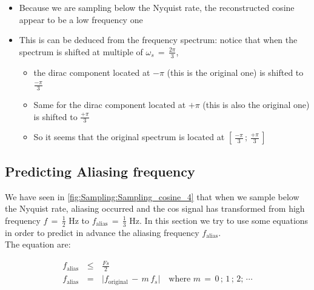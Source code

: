 \documentclass[12pt,a4paper]{book}
\begin{document}
\begin{itemize}

\item Because we are sampling below the Nyquist rate, the reconstructed cosine appear to be a low frequency one

\item This is can be deduced from the frequency spectrum: notice that when the spectrum is shifted at multiple of $\omega_s \, = \, \displaystyle\frac{2 \pi}{3}$, 

	\begin{itemize}
	
	\item the dirac component located at $-\pi$ (this is the original one) is shifted to $\displaystyle\frac{-\pi}{3}$	
	
		\item Same for the dirac component located at $+\pi$ (this is also the original one) is shifted to $\displaystyle\frac{+\pi}{3}$
		
		\item So it seems that the original spectrum is located at $\left[\, \displaystyle\frac{-\pi}{3} \, ; \, \displaystyle\frac{+\pi}{3} \, \right]$
	
	\end{itemize}

\end{itemize}


\subsection{Predicting Aliasing frequency}

We have seen in \autoref{fig:Sampling:Sampling_cosine_4} that when we sample below the Nyquist rate, aliasing occurred and the cos signal has transformed from high frequency $f \, = \, \displaystyle\frac{1}{2}$ Hz to $f_{\text{alias}} \, = \, \displaystyle\frac{1}{3}$ Hz. In this section we try to use some equations in order to predict in advance the aliasing frequency $f_{\text{alias}}$.\\

The equation are:

\begin{equation}
\begin{array}{rcl}
f_{\text{alias}} \, &\leq& \, \displaystyle\frac{Fs}{2} \\
f_{\text{alias}} \, &=& \, \lvert f_{\text{original}} \, - \, m \, f_s  \rvert \quad \text{where } m \, = \, 0 \, ; \, 1 \, ; \, 2 ;\, \cdots
\end{array}
\label{Eq:Sampling:alias_frequency}
\end{equation} 
\end{document}
